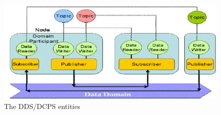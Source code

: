 \documentclass[Main]{subfiles}
\begin{document}
\begin{figure}[H]
\centering
\includegraphics[scale=0.8]{Figure/DDSentities.png}
\caption{The DDS/DCPS entities \cite{RTI}}
\label{Fig:Entities}
\end{figure}
\end{document}
